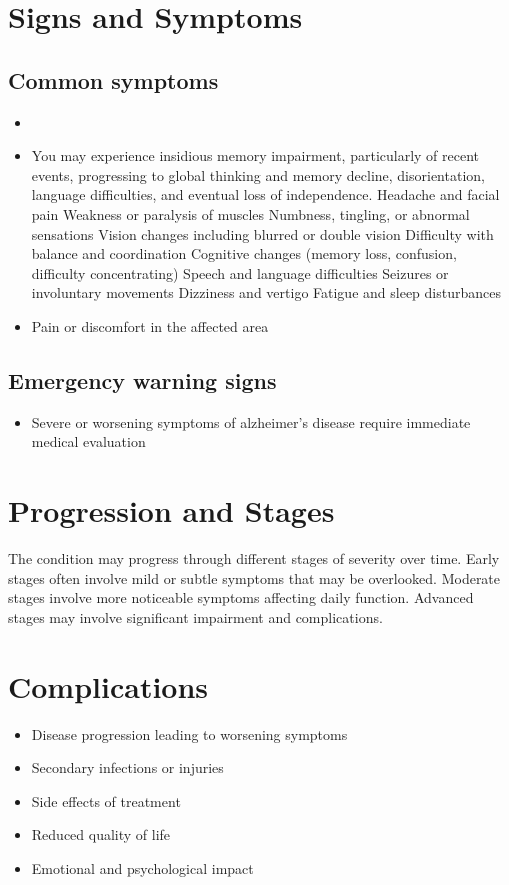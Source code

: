 \section{Signs and Symptoms}

\subsection{Common symptoms}
\begin{itemize}[noitemsep]
  \item \item You may experience insidious memory impairment, particularly of recent events, progressing to global thinking and memory decline, disorientation, language difficulties, and eventual loss of independence. Headache and facial pain Weakness or paralysis of muscles Numbness, tingling, or abnormal sensations Vision changes including blurred or double vision Difficulty with balance and coordination Cognitive changes (memory loss, confusion, difficulty concentrating) Speech and language difficulties Seizures or involuntary movements Dizziness and vertigo Fatigue and sleep disturbances

  \item Pain or discomfort in the affected area
  \end{itemize}

\subsection{Emergency warning signs}
\begin{itemize}[noitemsep]
  \item Severe or worsening symptoms of alzheimer's disease require immediate medical evaluation
\end{itemize}
\section{Progression and Stages}
The condition may progress through different stages of severity over time. Early stages often involve mild or subtle symptoms that may be overlooked. Moderate stages involve more noticeable symptoms affecting daily function. Advanced stages may involve significant impairment and complications.
\section{Complications}
\begin{itemize}[noitemsep]
  \item Disease progression leading to worsening symptoms
  \item Secondary infections or injuries
  \item Side effects of treatment
  \item Reduced quality of life
  \item Emotional and psychological impact
\end{itemize}
